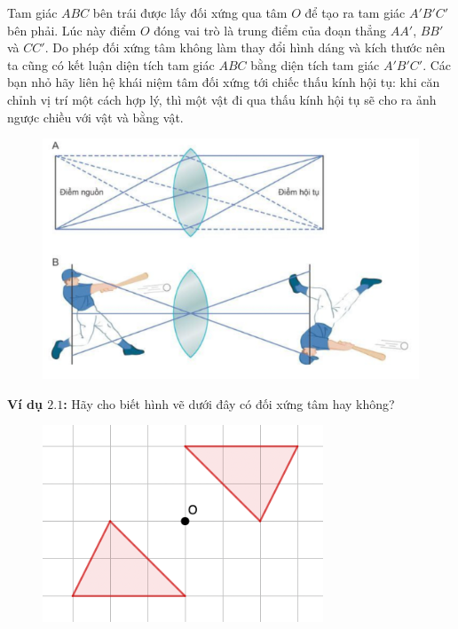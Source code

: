 \begin{multicols}{2}
\begin{figure}[H]
		\vspace*{-10pt}
	\end{figure}
	Tam giác $ABC$ bên trái được lấy đối xứng qua tâm $O$ để tạo ra tam giác $A'B'C'$ bên phải. Lúc này điểm $O$ đóng vai trò là trung điểm của đoạn thẳng $AA'$, $BB'$ và $CC'$. Do phép đối xứng tâm không làm thay đổi hình dáng và kích thước nên ta cũng có kết luận diện tích tam giác $ABC$ bằng diện tích tam giác $A'B'C'$. Các bạn nhỏ hãy liên hệ khái niệm tâm đối xứng tới chiếc thấu kính hội tụ: khi căn chỉnh vị trí một cách hợp lý, thì một vật đi qua thấu kính hội tụ sẽ cho ra ảnh ngược chiều với vật và bằng vật.
	\begin{figure}[H]
		\vspace*{-5pt}
		\centering
		\captionsetup{labelformat= empty, justification=centering}
		\includegraphics[width= 1\linewidth]{Picture10}
		\vspace*{-10pt}
	\end{figure}
	\textbf{\color{toancuabi}Ví dụ $\pmb{2.1}$:} Hãy cho biết hình vẽ dưới đây có đối xứng tâm hay không? 
	\begin{figure}[H]
		\vspace*{-5pt}
		\centering
		\captionsetup{labelformat= empty, justification=centering}
		\includegraphics[width= 1\linewidth]{Picture11}

\end{figure}
\end{multicols}
